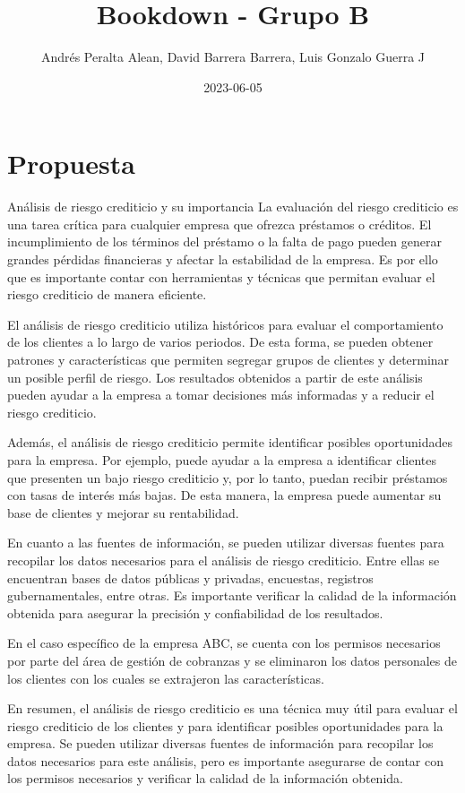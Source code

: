 \documentclass[
]{book}
\title{Bookdown - Grupo B}
\author{Andrés Peralta Alean, David Barrera Barrera, Luis Gonzalo Guerra J}
\date{2023-06-05}
\begin{document}
\maketitle

{
\setcounter{tocdepth}{1}
\tableofcontents
}
\hypertarget{propuesta}{%
\chapter{Propuesta}\label{propuesta}}

Análisis de riesgo crediticio y su importancia La evaluación del riesgo crediticio es una tarea crítica para cualquier empresa que ofrezca préstamos o créditos.
El incumplimiento de los términos del préstamo o la falta de pago pueden generar grandes pérdidas financieras y afectar la estabilidad de la empresa.
Es por ello que es importante contar con herramientas y técnicas que permitan evaluar el riesgo crediticio de manera eficiente.

El análisis de riesgo crediticio utiliza históricos para evaluar el comportamiento de los clientes a lo largo de varios periodos.
De esta forma, se pueden obtener patrones y características que permiten segregar grupos de clientes y determinar un posible perfil de riesgo.
Los resultados obtenidos a partir de este análisis pueden ayudar a la empresa a tomar decisiones más informadas y a reducir el riesgo crediticio.

Además, el análisis de riesgo crediticio permite identificar posibles oportunidades para la empresa.
Por ejemplo, puede ayudar a la empresa a identificar clientes que presenten un bajo riesgo crediticio y, por lo tanto, puedan recibir préstamos con tasas de interés más bajas.
De esta manera, la empresa puede aumentar su base de clientes y mejorar su rentabilidad.

En cuanto a las fuentes de información, se pueden utilizar diversas fuentes para recopilar los datos necesarios para el análisis de riesgo crediticio.
Entre ellas se encuentran bases de datos públicas y privadas, encuestas, registros gubernamentales, entre otras.
Es importante verificar la calidad de la información obtenida para asegurar la precisión y confiabilidad de los resultados.

En el caso específico de la empresa ABC, se cuenta con los permisos necesarios por parte del área de gestión de cobranzas y se eliminaron los datos personales de los clientes con los cuales se extrajeron las características.

En resumen, el análisis de riesgo crediticio es una técnica muy útil para evaluar el riesgo crediticio de los clientes y para identificar posibles oportunidades para la empresa.
Se pueden utilizar diversas fuentes de información para recopilar los datos necesarios para este análisis, pero es importante asegurarse de contar con los permisos necesarios y verificar la calidad de la información obtenida.
\end{document}
